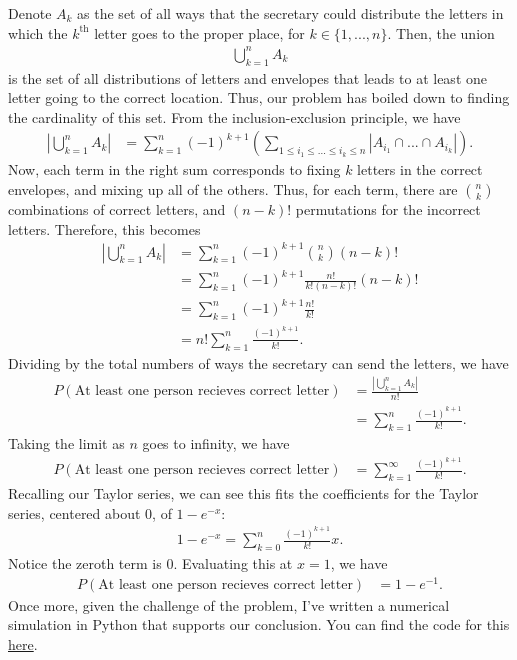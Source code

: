 \documentclass[10pt,a4paper]{article}
\theoremstyle{theorem}
\theoremstyle{definition}
\begin{document}
Denote $A_k$ as the set of all ways that the secretary could distribute the letters in which the $k^{\text{th}}$ letter goes to the proper place, for $k \in \{1, ..., n\}$. Then,  the union 
\begin{align*}
\bigcup_{k=1}^n A_k
\end{align*}
is the set of all distributions of letters and envelopes that leads to at least one letter going to the correct location. Thus, our problem has boiled down to finding the cardinality of this set. From the inclusion-exclusion principle, we have
\begin{align*}
|\bigcup_{k=1}^n A_k| &= \sum_{k=1}^n (-1 )^{k+1} \left( \sum_{1 \leq i_1 \leq ... \leq i_k \leq n} |A_{i_1} \cap ... \cap A_{i_k}| \right).
\end{align*}
Now,  each term in the right sum corresponds to fixing $k$ letters in the correct envelopes, and mixing up all of the others. Thus,  for each term, there are ${n \choose k}$ combinations of correct letters, and $(n-k)!$ permutations for the incorrect letters. Therefore, this becomes
\begin{align*}
|\bigcup_{k=1}^n A_k| &= \sum_{k=1}^n (-1 )^{k+1} {n \choose k} (n-k)!\\
&= \sum_{k=1}^n (-1 )^{k+1} \frac{n!}{k! (n-k)!}(n-k)!\\
&= \sum_{k=1}^n (-1 )^{k+1} \frac{n!}{k!}\\
&= n! \sum_{k=1}^n  \frac{(-1 )^{k+1}}{k!}.
\end{align*}
Dividing by the total numbers of ways the secretary can send the letters, we have
\begin{align*}
P(\text{At least one person recieves correct letter}) &= \frac{|\bigcup_{k=1}^n A_k| }{n!} \\
&= \sum_{k=1}^n  \frac{(-1 )^{k+1}}{k!}.
\end{align*}
Taking the limit as $n$ goes to infinity, we have
\begin{align*}
P(\text{At least one person recieves correct letter}) &= \sum_{k=1}^\infty  \frac{(-1 )^{k+1}}{k!}.
\end{align*}
Recalling our Taylor series, we can see this fits the coefficients for the Taylor series, centered about 0, of $1 - e^{-x}$:
\begin{align*}
1 - e^{-x} = \sum_{k=0}^n  \frac{(-1 )^{k+1}}{k!} x.
\end{align*}
Notice the zeroth term is $0$.  Evaluating this at $x = 1$, we have 
\begin{align*}
P(\text{At least one person recieves correct letter}) &= 1 - e^{-1}.
\end{align*}
Once more, given the challenge of the problem, I've written a numerical simulation in Python that supports our conclusion.  You can find the code for this \href{https://github.com/jeremiahgivens/MA-585-Probability/blob/main/HomeworkSolutions/Homework1/Homework1BonusProblem.py}{here}.
\end{document}
